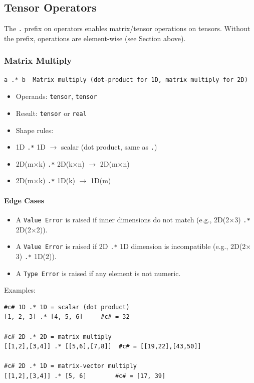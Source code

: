 \subsection{Tensor Operators}
The \texttt{.} prefix on operators enables matrix/tensor operations on tensors. Without the prefix, operations are element-wise (see Section above).

\subsubsection{Matrix Multiply}
\begin{verbatim}
a .* b  Matrix multiply (dot-product for 1D, matrix multiply for 2D)
\end{verbatim}

\begin{itemize}
\item Operands: \texttt{tensor}, \texttt{tensor}
\item Result: \texttt{tensor} or \texttt{real}
\item Shape rules:
  \item 1D \texttt{.*} 1D $\rightarrow$ scalar (dot product, same as \texttt{.})
  \item 2D(m$\times$k) \texttt{.*} 2D(k$\times$n) $\rightarrow$ 2D(m$\times$n)
  \item 2D(m$\times$k) \texttt{.*} 1D(k) $\rightarrow$ 1D(m)
\end{itemize}

\paragraph{Edge Cases}
\begin{itemize}
\item A \texttt{Value Error} is raised if inner dimensions do not match (e.g., 2D(2$\times$3) \texttt{.*} 2D(2$\times$2)).
\item A \texttt{Value Error} is raised if 2D \texttt{.*} 1D dimension is incompatible (e.g., 2D(2$\times$3) \texttt{.*} 1D(2)).
\item A \texttt{Type Error} is raised if any element is not numeric.
\end{itemize}

Examples:
\begin{verbatim}
#c# 1D .* 1D = scalar (dot product)
[1, 2, 3] .* [4, 5, 6]     #c# = 32

#c# 2D .* 2D = matrix multiply
[[1,2],[3,4]] .* [[5,6],[7,8]]  #c# = [[19,22],[43,50]]

#c# 2D .* 1D = matrix-vector multiply
[[1,2],[3,4]] .* [5, 6]        #c# = [17, 39]
\end{verbatim}


